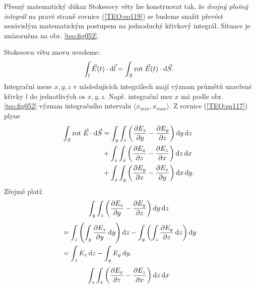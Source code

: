           
        
        Přesný matematický důkaz Stokesovy věty lze konstruovat tak, že \emph{dvojný plošný 
        integrál} na pravé straně rovnice (\ref{TEO:eq119}) se budeme snažit převést 
        nezávislým matematickým postupem na jednoduchý křivkový integrál. Situace je znázorněna na 
        obr. \ref{teo:fig052}.

       
        Stokesovu větu znovu uvedeme:
        \begin{equation*}
          \int_{l}\vec{E}(t)\cdot \mathop{}\!\mathrm{d}\vec{l} = \int_{S}\mathrm{rot}\;\vec{E}(t)\cdot \mathop{}\!\mathrm{d}\vec{S}.
        \end{equation*}
        Integrační meze \(x, y, z\) v následujících integrálech mají význam průmětů uzavřené křivky 
        \(l\) do jednotlivých os \(x, y, z\). Např. integrační mez \(x\) má podle obr. 
        \ref{teo:fig052} význam integračního intervalu \(\langle x_{min}, 
        x_{max}\rangle\). Z rovnice (\ref{TEO:eq117}) plyne
        \begin{align}\label{TEO:eq121}
          \int_S\mathrm{rot}\;\vec{E}\cdot \mathop{}\!\mathrm{d}\vec{S} 
             &= \int_y\int_z\left(\dfrac{\partial E_z}{\partial y} - \dfrac{\partial E_y}{\partial z}\right)\mathop{}\!\mathrm{d}y\mathop{}\!\mathrm{d}z \nonumber \\
             &+ \int_z\int_x\left(\dfrac{\partial E_x}{\partial z} - \dfrac{\partial E_z}{\partial x}\right)\mathop{}\!\mathrm{d}z\mathop{}\!\mathrm{d}x \nonumber \\
             &+ \int_x\int_y\left(\dfrac{\partial E_y}{\partial x} - \dfrac{\partial E_x}{\partial y}\right)\mathop{}\!\mathrm{d}x\mathop{}\!\mathrm{d}y. 
        \end{align}
        Zřejmě platí:
        \begin{equation*}
           \int_y\int_z\left(\dfrac{\partial E_z}{\partial y} - \dfrac{\partial E_y}{\partial z}\right)\mathop{}\!\mathrm{d}y\mathop{}\!\mathrm{d}z 
        \end{equation*}
        \begin{align*}
          {} &= \int_z\left(\int_y\dfrac{\partial E_z}{\partial y}\mathop{}\!\mathrm{d}y\right)\mathop{}\!\mathrm{d}z 
            - \int_y\left(\int_z\dfrac{\partial E_y}{\partial z}\mathop{}\!\mathrm{d}z\right)\mathop{}\!\mathrm{d}y                      \\
          {} &= \int_zE_z\mathop{}\!\mathrm{d}z - \int_yE_y\mathop{}\!\mathrm{d}y.                                    
        \end{align*}
        \begin{equation*}
          \int_z\int_x\left(\dfrac{\partial E_x}{\partial z} - \dfrac{\partial E_z}{\partial x}\right)\mathop{}\!\mathrm{d}z\mathop{}\!\mathrm{d}x
        \end{equation*}
